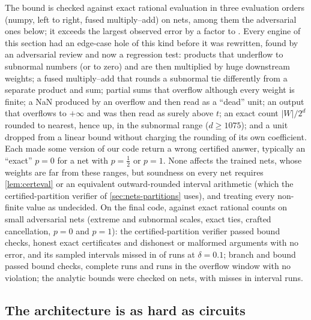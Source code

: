 The bound is checked against exact rational evaluation in three evaluation orders
(numpy, left to right, fused multiply--add) on \nnErrNets{} nets, among them the
adversarial ones below; it exceeds the largest observed error by a factor
\nnErrMarginMin{} to \nnErrMarginMax{}. Every engine of this section had an
edge-case hole of this kind before it was rewritten, found by an adversarial review
and now a regression test: products that underflow to subnormal numbers (or to zero)
and are then multiplied by huge downstream weights; a fused multiply--add that rounds a
subnormal tie differently from a separate product and sum; partial sums that overflow
although every weight is finite; a NaN produced by an overflow and then read as a
``dead'' unit; an output that overflows to $+\infty$ and was then read as surely above
$t$; an exact count $|W|/2^d$ rounded to nearest, hence up, in the subnormal range
($d\ge1075$); and a unit dropped from a linear bound without charging the rounding of
its own coefficient. Each made some version of our code return a wrong certified
answer, typically an ``exact'' $p=0$ for a net with $p=\frac12$ or $p=1$. None affects
the trained nets, whose weights are far from these ranges, but soundness on every net
requires \cref{lem:certeval} or an equivalent outward-rounded interval arithmetic
(which the certified-partition verifier of \cref{sec:nets-partitions} uses), and
treating every non-finite value as undecided. On the final code, against exact rational
counts on small adversarial nets (extreme and subnormal scales, exact ties, crafted
cancellation, $p=0$ and $p=1$): the certified-partition verifier passed \nnProvBoundChecks{}
bound checks, \nnProvExact{} honest exact certificates and \nnProvTamper{} dishonest or
malformed arguments with no error, and its sampled intervals missed in \nnProvCovMiss{}
of \nnProvCov{} runs at $\delta=0.1$; branch and bound passed \nnVerBoundChecks{} bound
checks, \nnVerBab{} complete runs and \nnVerOverflowRuns{} runs in the overflow window
with no violation; the analytic bounds were checked on \nnAnaNets{} nets, with
\nnAnaCovMiss{} misses in \nnAnaCov{} interval runs.

\subsection{The architecture is as hard as circuits}\label{sec:nets-hard}

